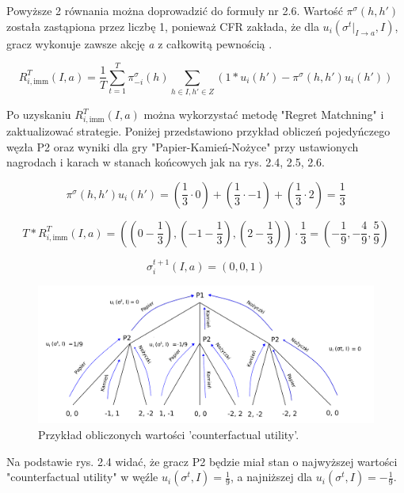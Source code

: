 \documentclass[12pt,oneside,a4paper]{report}
\begin{document}
Powyższe 2 równania można doprowadzić do formuły nr 2.6. Wartość $\pi^{\sigma} (h,h')$ została
zastąpiona przez liczbę 1, ponieważ
CFR zakłada, że dla $u_{i}(\sigma^{t}|_{I \rightarrow a}, I)$, gracz wykonuje zawsze akcję \emph{a} 
z całkowitą pewnością \cite{CFR}.



\begin{equation}
   R^{T}_{i,\text{imm}} (I, a) = \frac{1}{T} \sum^{T}_{t=1}
   \pi_{-i}^{\sigma}(h)\sum_{h \in I, h' \in Z}(1*u_{i}(h') - \pi^{\sigma}(h,h')u_{i}(h'))
\end{equation}


\vspace{0.5cm}
Po uzyskaniu $R^{T}_{i,\text{imm}} (I, a)$ można wykorzystać metodę "Regret Matchning" i
zaktualizować strategie.
Poniżej przedstawiono przykład obliczeń pojedyńczego węzła P2 oraz wyniki 
dla gry "Papier-Kamień-Nożyce" przy ustawionych
nagrodach i karach w stanach końcowych jak na rys. 2.4, 2.5, 2.6.

\begin{center}
$$
   \pi^{\sigma}(h,h')u_{i}(h') =  (\frac{1}{3} \cdot 0) + (\frac{1}{3} \cdot -1) +
   (\frac{1}{3} \cdot 2) = \frac{1}{3}
$$

$$
T*R^{T}_{i,\text{imm}} (I, a) =
((0-\frac{1}{3}), (-1-\frac{1}{3}), (2-\frac{1}{3})) \cdot \frac{1}{3}= (-\frac{1}{9},
-\frac{4}{9}, \frac{5}{9}) 
$$

$$
\sigma^{t+1}_{i}\left(I, a \right) = (0, 0, 1)
$$
\end{center}
\vspace{0.5cm}


\begin{figure}[th!]
            \center
           \includegraphics[width=1\textwidth]{./img/drawing2.pdf}
           \caption{Przykład obliczonych wartości 'counterfactual utility'.}
\end{figure}

Na podstawie rys. 2.4 widać, że gracz P2 będzie miał stan o najwyższej wartości "counterfactual utility" w węźle $u_{i}
(\sigma^{t}, I)=\frac{1}{9}$, a najniższej dla $u_{i}(\sigma^{t}, I)=-\frac{1}{9}$.
\end{document}
